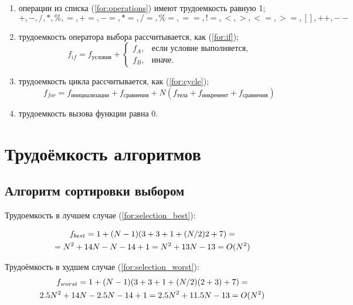 \begin{enumerate}
	\item операции из списка (\ref{for:operations}) имеют трудоемкость равную 1;
	\begin{equation}
		\label{for:operations}
		+, -, /, *, \%, =, +=, -=, *=, /=, \%=, ==, !=, <, >, <=, >=, [], ++, {-}-
	\end{equation}
	\item трудоемкость оператора выбора  рассчитывается, как (\ref{for:if});
	\begin{equation}
		\label{for:if}
		f_{if} = f_{\text{условия}} +
		\begin{cases}
			f_A, & \text{если условие выполняется,}\\
			f_B, & \text{иначе.}
		\end{cases}
	\end{equation}
	\item трудоемкость цикла рассчитывается, как (\ref{for:cycle});
	\begin{equation}
		\label{for:cycle}
		f_{for} = f_{\text{инициализации}} + f_{\text{сравнения}} + N(f_{\text{тела}} + f_{\text{инкремент}} + f_{\text{сравнения}})
	\end{equation}
	\item трудоемкость вызова функции равна 0.
\end{enumerate}

\section{Трудоёмкость алгоритмов}

\subsection{Алгоритм сортировки выбором}

Трудоемкость в лучшем случае (\ref{for:selection_best}):

\begin{gather}
	\label{for:selection_best}
    f_{best} = 1 + (N - 1)(3 + 3 + 1 + (N / 2)2 + 7) =\notag \\
    = N^2 + 14N - N - 14 + 1 = N^2 + 13N - 13  = O(N^2)
\end{gather}

Трудоёмкость в худшем случае (\ref{for:selection_worst}):
\begin{gather}
	\label{for:selection_worst}
    f_{worst} = 1 + (N - 1)(3 + 3 + 1 + (N / 2)(2 + 3) + 7) =\notag \\ 2.5N^2 + 14N - 2.5N - 14 + 1 = 2.5N^2 + 11.5N - 13 = O(N^2)
\end{gather}

